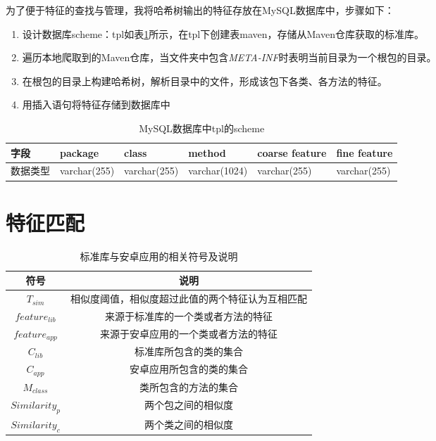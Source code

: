 为了便于特征的查找与管理，我将哈希树输出的特征存放在MySQL数据库中，步骤如下：

\begin{enumerate}
\item{设计数据库scheme：tpl如表\ref{tab:mysql}所示，在tpl下创建表maven，存储从Maven仓库获取的标准库。}
\item{遍历本地爬取到的Maven仓库，当文件夹中包含\textit{META-INF}时表明当前目录为一个根包的目录。}
\item{在根包的目录上构建哈希树，解析目录中的文件，形成该包下各类、各方法的特征。}
\item{用插入语句将特征存储到数据库中}
\end{enumerate}

\begin{table}[!hpt]
  \caption{MySQL数据库中tpl的scheme}
  \label{tab:mysql}
  \centering
  \begin{tabular}{l|lllll} \toprule
    字段 &  package & class & method & coarse feature & fine feature \\ \midrule
    数据类型 & varchar(255) & varchar(255) & varchar(1024) & varchar(255) & varchar(255)  \\  \bottomrule

  \end{tabular}
\end{table}



\section{特征匹配}


\begin{table}[!hpt]
  \caption{标准库与安卓应用的相关符号及说明}
  \label{tab:symbol}
  \centering
  \begin{tabular}{cc} \toprule
    符号 &  说明 \\ \midrule
    $T_{sim}$ & 相似度阈值，相似度超过此值的两个特征认为互相匹配 \\
	$feature_{lib}$ & 来源于标准库的一个类或者方法的特征 \\ 
	$feature_{app}$ & 来源于安卓应用的一个类或者方法的特征 \\
	$C_{lib}$ & 标准库所包含的类的集合 \\
	$C_{app}$ & 安卓应用所包含的类的集合 \\
	$M_{class}$ & 类所包含的方法的集合\\
	$Similarity_p$ & 两个包之间的相似度\\
	$Similarity_c$ & 两个类之间的相似度\\
	 \bottomrule

  \end{tabular}
\end{table}


